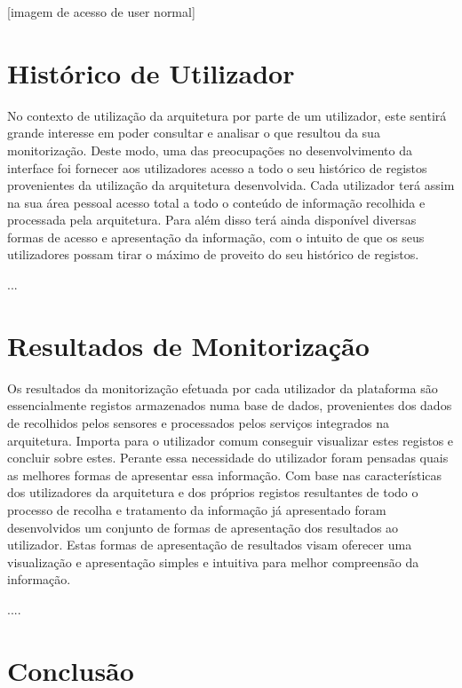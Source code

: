 [imagem de acesso de user normal]

\section{Histórico de Utilizador}

No contexto de utilização da arquitetura por parte de um utilizador, este sentirá grande interesse em poder consultar e analisar o que resultou da sua monitorização. Deste modo, uma das preocupações no desenvolvimento da interface foi fornecer aos utilizadores acesso a todo o seu histórico de registos provenientes da utilização da arquitetura desenvolvida. Cada utilizador terá assim na sua área pessoal acesso total a todo o conteúdo de informação recolhida e processada pela arquitetura. Para além disso terá ainda disponível diversas formas de acesso e apresentação da informação, com o intuito de que os seus utilizadores possam tirar o máximo de proveito do seu histórico de registos.

...

\section{Resultados de Monitorização}

Os resultados da monitorização efetuada por cada utilizador da plataforma são essencialmente registos armazenados numa base de dados, provenientes dos dados de recolhidos pelos sensores e processados pelos serviços integrados na arquitetura. Importa para o utilizador comum conseguir visualizar estes registos e concluir sobre estes. Perante essa necessidade do utilizador foram pensadas quais as melhores formas de apresentar essa informação. Com base nas características dos utilizadores da arquitetura e dos próprios registos resultantes de todo o processo de recolha e tratamento da informação já apresentado foram desenvolvidos um conjunto de formas de apresentação dos resultados ao utilizador. Estas formas de apresentação de resultados visam oferecer uma visualização e apresentação simples e intuitiva para melhor compreensão da informação.

....


\section{Conclusão}